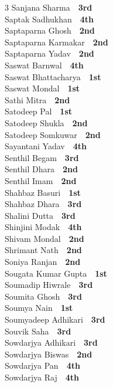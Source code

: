 \documentclass[11pt,a4paper]{article}
\begin{document}
\begin{multicols}{3}
Sanjana Sharma~\dotfill~\textbf{3rd}\\
Saptak Sadhukhan~\dotfill~\textbf{4th}\\
Saptaparna Ghosh~\dotfill~\textbf{2nd}\\
Saptaparna Karmakar~\dotfill~\textbf{2nd}\\
Saptaparna Yadav~\dotfill~\textbf{2nd}\\
Saswat Barnwal~\dotfill~\textbf{4th}\\
Saswat Bhattacharya~\dotfill~\textbf{1st}\\
Saswat Mondal~\dotfill~\textbf{1st}\\
Sathi Mitra~\dotfill~\textbf{2nd}\\
Satodeep Pal~\dotfill~\textbf{1st}\\
Satodeep Shukla~\dotfill~\textbf{2nd}\\
Satodeep Somkuwar~\dotfill~\textbf{2nd}\\
Sayantani Yadav~\dotfill~\textbf{4th}\\
Senthil Begam~\dotfill~\textbf{3rd}\\
Senthil Dhara~\dotfill~\textbf{2nd}\\
Senthil Imam~\dotfill~\textbf{2nd}\\
Shahbaz Basuri~\dotfill~\textbf{1st}\\
Shahbaz Dhara~\dotfill~\textbf{3rd}\\
Shalini Dutta~\dotfill~\textbf{3rd}\\
Shinjini Modak~\dotfill~\textbf{4th}\\
Shivam Mondal~\dotfill~\textbf{2nd}\\
Shrimant Nath~\dotfill~\textbf{2nd}\\
Soniya Ranjan~\dotfill~\textbf{2nd}\\
Sougata Kumar Gupta~\dotfill~\textbf{1st}\\
Soumadip Hiwrale~\dotfill~\textbf{3rd}\\
Soumita Ghosh~\dotfill~\textbf{3rd}\\
Soumya Nain~\dotfill~\textbf{1st}\\
Soumyadeep Adhikari~\dotfill~\textbf{3rd}\\
Souvik Saha~\dotfill~\textbf{3rd}\\
Sowdarjya Adhikari~\dotfill~\textbf{3rd}\\
Sowdarjya Biswas~\dotfill~\textbf{2nd}\\
Sowdarjya Pan~\dotfill~\textbf{4th}\\
Sowdarjya Raj~\dotfill~\textbf{4th}\\

\end{multicols}
\end{document}
